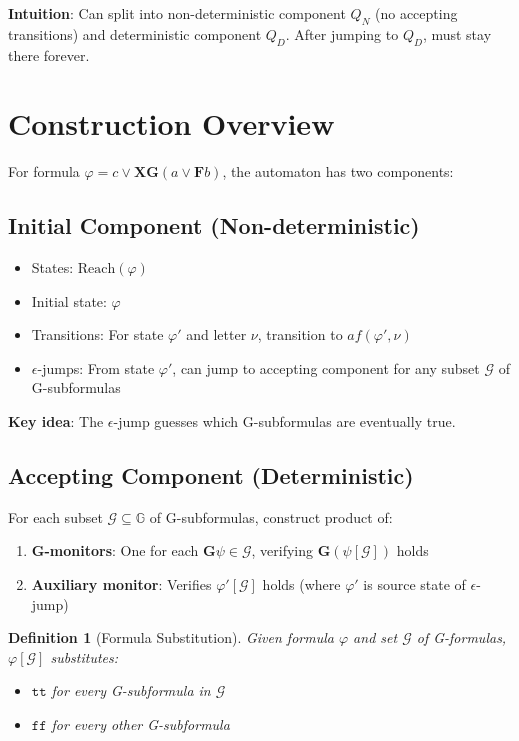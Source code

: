 \documentclass{article}
\newtheorem{definition}{Definition}
\begin{document}
\textbf{Intuition}: Can split into non-deterministic component $Q_N$ (no accepting transitions) and deterministic component $Q_D$. After jumping to $Q_D$, must stay there forever.

\section{Construction Overview}

For formula $\varphi = c \lor \mathbf{X}\mathbf{G}(a \lor \mathbf{F}b)$, the automaton has two components:

\subsection{Initial Component (Non-deterministic)}

\begin{itemize}
    \item States: $\text{Reach}(\varphi)$
    \item Initial state: $\varphi$
    \item Transitions: For state $\varphi'$ and letter $\nu$, transition to $af(\varphi', \nu)$
    \item $\epsilon$-jumps: From state $\varphi'$, can jump to accepting component for any subset $\mathcal{G}$ of G-subformulas
\end{itemize}

\textbf{Key idea}: The $\epsilon$-jump guesses which G-subformulas are eventually true.

\subsection{Accepting Component (Deterministic)}

For each subset $\mathcal{G} \subseteq \mathbb{G}$ of G-subformulas, construct product of:

\begin{enumerate}
    \item \textbf{G-monitors}: One for each $\mathbf{G}\psi \in \mathcal{G}$, verifying $\mathbf{G}(\psi[\mathcal{G}])$ holds
    \item \textbf{Auxiliary monitor}: Verifies $\varphi'[\mathcal{G}]$ holds (where $\varphi'$ is source state of $\epsilon$-jump)
\end{enumerate}

\begin{definition}[Formula Substitution]
Given formula $\varphi$ and set $\mathcal{G}$ of G-formulas, $\varphi[\mathcal{G}]$ substitutes:
\begin{itemize}
    \item $\mathtt{tt}$ for every G-subformula in $\mathcal{G}$
    \item $\mathtt{ff}$ for every other G-subformula
\end{itemize}
\end{definition}
\end{document}
